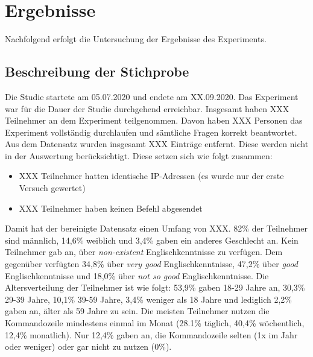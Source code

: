 \section{Ergebnisse}
Nachfolgend erfolgt die Untersuchung der Ergebnisse des Experiments.

\subsection{Beschreibung der Stichprobe}\label{beschreibung}
Die Studie startete am 05.07.2020 und endete am XX.09.2020. Das Experiment war für die Dauer der Studie durchgehend erreichbar. Insgesamt haben XXX Teilnehmer an dem Experiment teilgenommen. Davon haben XXX Personen das Experiment vollständig durchlaufen und sämtliche Fragen korrekt beantwortet. Aus dem Datensatz wurden insgesamt XXX Einträge entfernt. Diese werden nicht in der Auswertung berücksichtigt. Diese setzen sich wie folgt zusammen:

\begin{itemize}
  \item XXX Teilnehmer hatten identische IP-Adressen (es wurde nur der erste Versuch gewertet)
  \item XXX Teilnehmer haben keinen Befehl abgesendet
\end{itemize}

Damit hat der bereinigte Datensatz einen Umfang von XXX. 82\% der Teilnehmer sind männlich, 14,6\% weiblich und 3,4\% gaben ein anderes Geschlecht an. Kein Teilnehmer gab an, über \textit{non-existent} Englischkenntnisse zu verfügen. Dem gegenüber verfügten 34,8\% über \textit{very good} Englischkenntnisse, 47,2\% über \textit{good} Englischkenntnisse und 18,0\% über \textit{not so good} Englischkenntnisse. Die Altersverteilung der Teilnehmer ist wie folgt: 53,9\% gaben 18-29 Jahre an, 30,3\%  29-39 Jahre,  10,1\% 39-59 Jahre, 3,4\% weniger als 18 Jahre und lediglich 2,2\% gaben an, älter als 59 Jahre zu sein. Die meisten Teilnehmer nutzen die Kommandozeile mindestens einmal im Monat (28.1\% täglich, 40,4\% wöchentlich, 12,4\% monatlich). Nur 12,4\% gaben an, die Kommandozeile selten (1x im Jahr oder weniger) oder gar nicht zu nutzen (0\%). 

